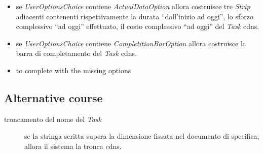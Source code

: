 \begin{enumerate}
\begin{itemize}
    	\item se \emph{UserOptionsChoice} contiene \emph{ActualDataOption} allora
    	costruisce tre \emph{Strip} adiacenti contenenti rispettivamente la durata
    	“dall’inizio ad oggi”, lo sforzo complessivo “ad oggi” effettuato, il
    	costo complessivo “ad oggi” del \emph{Task} cdns.
    	
		\item se \emph{UserOptionsChoice} contiene \emph{CompletitionBarOption}
		allora costruisce la barra di completamento del \emph{Task} cdns.
		
		\item to complete with the missing options
		
    \end{itemize}
\end{enumerate}

\subsection{Alternative course}
\begin{description}
  \item[troncamento del nome del \emph{Task}] se la stringa scritta supera la
  dimensione fissata nel documento di specifica, allora il sistema la tronca
  cdns.


\end{description}
